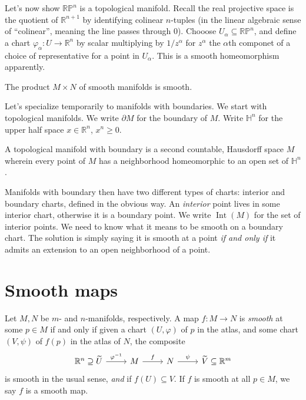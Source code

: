 
Let's now show $\mathbb{R} \mathbb{P} ^n$ is a topological manifold. Recall the real projective space is the quotient of $\mathbb{R} ^{n+1} $ by identifying colinear $n$-tuples (in the linear algebraic sense of ``colinear'', meaning the line passes through 0). Chooose $U_\alpha \subseteq \mathbb{R} \mathbb{P} ^n$, and define a chart $\varphi _\alpha : U \to \mathbb{R} ^n$ by scalar multiplying by $1/z^\alpha $ for $z^\alpha $ the $\alpha $th componet of a choice of representative for a point in $U_\alpha $. This is a smooth homeomorphism apparently.

The product $M\times N$ of smooth manifolds is smooth.

Let's specialize temporarily to manifolds with boundaries. We start with topological manifolds. We write $\partial M$ for the boundary of $M$. Write $\mathbb{H}^n$ for the upper half space $x\in\mathbb{R} ^n$, $x^n \geq 0$.

\begin{definition}\label{1.1.12}
	A topological manifold with boundary is a second countable, Hausdorff space $M$ wherein every point of $M$ has a neighborhood homeomorphic to an open set of $\mathbb{H} ^n$.
\end{definition}

Manifolds with boundary then have two different types of charts: interior and boundary charts, defined in the obvious way. An \emph{interior} point lives in some interior chart, otherwise it is a boundary point. We write $\operatorname{Int} (M)$ for the set of interior points. We need to know what it means to be smooth on a boundary chart. The solution is simply saying it is smooth at a point \emph{if and only if} it admits an extension to an open neighborhood of a point.

\section{Smooth maps}

\begin{definition}\label{1.2.1}
	Let $M,N$ be $m$- and $n$-manifolds, respectively. A map $f : M \to N$ is \emph{smooth} at some $p\in M$ if and only if given a chart $(U,\varphi )$ of $p$ in the atlas, and some chart $(V,\psi )$ of $f(p)$ in the atlas of $N$, the composite
	\[\begin{tikzcd}[row sep = 2.5em, column sep = 2.5em]
	\mathbb{R} ^n \supseteq \widetilde{U} \ar[" \varphi ^{-1}  ", r]  & M \ar[" f ", r]  & N \ar[" \psi  ", r]  & \widetilde{V} \subseteq \mathbb{R} ^m
	\end{tikzcd}\]
	is smooth in the usual sense, \emph{and} if $f(U)\subseteq V$. If $f$ is smooth at all $p\in M$, we say $f$ is a smooth map.
\end{definition}

